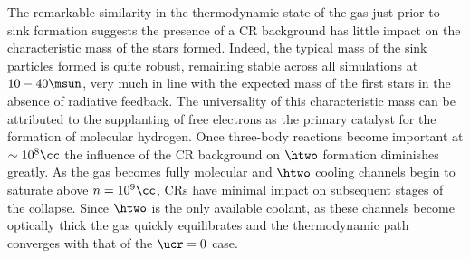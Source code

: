 The remarkable similarity in the thermodynamic state of the gas just prior to sink formation suggests the presence of a CR background has little impact on the characteristic mass of the stars formed.  
Indeed, the typical mass of the sink particles formed is quite robust, remaining stable across all simulations at $10-40\msun$, very much in line with the expected mass of the first stars in the absence of radiative feedback. 
The universality of this characteristic mass can be attributed to the supplanting of free electrons as the primary catalyst for the formation of molecular hydrogen.  Once three-body reactions become important at $\sim10^8\cc$ the influence of the CR background on $\htwo$ formation diminishes greatly.  As the gas becomes fully molecular and $\htwo$ cooling channels begin to saturate above $n=10^9\cc$, CRs have minimal impact on subsequent stages of the collapse.  Since $\htwo$ is the only available coolant, as these channels become optically thick the gas quickly equilibrates and the thermodynamic path converges with that of the $\ucr=0$ case.